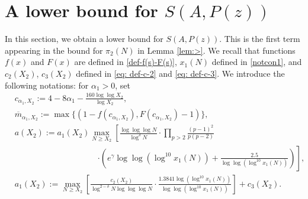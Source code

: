\documentclass[12pt]{amsart}
\begin{document}
\section{A lower bound for $S(A,P(z))$}
\label{section:1}
In this section, we obtain a lower bound for $S(A,P(z))$. This is the first term appearing in the bound for $\pi_2(N)$ in Lemma \ref{lem:>}. We recall that functions $f(x)$ and $F(x)$ are defined in \eqref{def-f(s)-F(s)}, $x_1(N)$ defined in \eqref{notcon1}, and $c_2(X_2)$, $c_3(X_2)$ defined in \eqref{eq: def-c-2} and \eqref{eq: def-c-3}. We introduce the following notations: for $\alpha_1 > 0$, set
\begin{align}
&c_{\alpha_1,X_2}:=4-8\alpha_1-\frac{160\log\log X_2}{\log X_2}, \label{eq: def-c-alpha1-X2}\\
&\overline{m}_{\alpha_1,X_2}:=\max\{(1-f(c_{\alpha_1,X_2}),F(c_{\alpha_1,X_2})-1)\},\label{eq: def-m-bar-alpha1-X2}\\
&a(X_2):=a_1(X_2)\max_{N\ge X_2}\left[\frac{\log\log\log N}{\log^{\delta}N}\cdot\prod_{p>2}\frac{(p-1)^2}{p(p-2)}\right.\label{eq: def-a(X_2)}\\
&\qquad\qquad\qquad\qquad\qquad\left.\cdot\left(e^{\gamma}\log\log(\log^{10}x_1(N))+\frac{2.5}{\log\log(\log^{10}x_1(N))}\right)\right], \nonumber\\
&a_1(X_2):=\max_{N\ge X_2}\left[\frac{c_2(X_2)}{\log^{2-\delta}N\log\log\log N}\cdot\frac{1.3841\log(\log^{10}x_1(N))}{\log\log(\log^{10}x_1(N))}\right]+c_3(X_2).\label{eq: def-a_1(X_2)}
\end{align}
\end{document}
